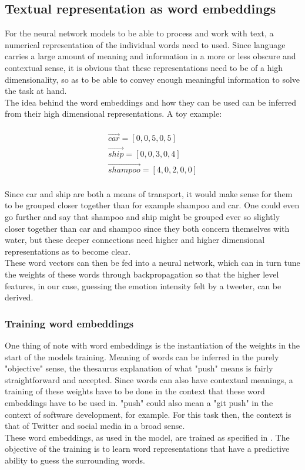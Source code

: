 \subsection{Textual representation as word embeddings}
For the neural network models to be able to process and work with text, a numerical representation of the individual words need to used. Since language carries a large amount of meaning and information in a more or less obscure and contextual sense, it is obvious that these representations need to be of a high dimensionality, so as to be able to convey enough meaningful information to solve the task at hand.\\
The idea behind the word embeddings and how they can be used can be inferred from their high dimensional representations. A toy example:\\
\\
\begin{equation}
\begin{aligned}
\vec{car} = [0,0,5,0,5]\\
\vec{ship} = [0,0,3,0,4]\\
\vec{shampoo} = [4,0,2,0,0]
\end{aligned}
\end{equation}\\
Since car and ship are both a means of transport, it would make sense for them to be grouped closer together than for example shampoo and car. One could even go further and say that shampoo and ship might be grouped ever so slightly closer together than car and shampoo since they both concern themselves with water, but these deeper connections need higher and higher dimensional representations as to become clear.\\
These word vectors can then be fed into a neural network, which can in turn tune the weights of these words through backpropagation so that the higher level features, in our case, guessing the emotion intensity felt by a tweeter, can be derived.

\subsubsection{Training word embeddings}
One thing of note with word embeddings is the instantiation of the weights in the start of the models training. Meaning of words can be inferred in the purely "objective" sense, the thesaurus explanation of what "push" means is fairly straightforward and accepted. Since words can also have contextual meanings, a training of these weights have to be done in the context that these word embeddings have to be used in. "push" could also mean a "git push" in the context of software development, for example. For this task then, the context is that of Twitter and social media in a broad sense.\\
These word embeddings, as used in the model, are trained as specified in \cite{mikolov}. The objective of the training is to learn word representations that have a predictive ability to guess the surrounding words. 

